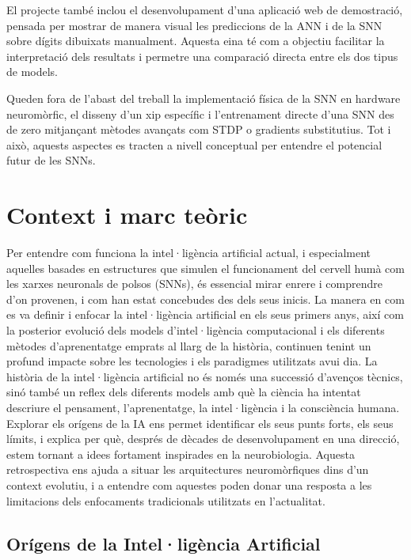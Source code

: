 \documentclass[a4paper,11pt, titlepage, twoside]{article}
\begin{document}
El projecte també inclou el desenvolupament d’una aplicació web de demostració, pensada per mostrar de manera visual les prediccions de la ANN i de la SNN sobre dígits dibuixats manualment. Aquesta eina té com a objectiu facilitar la interpretació dels resultats i permetre una comparació directa entre els dos tipus de models.

Queden fora de l’abast del treball la implementació física de la SNN en hardware neuromòrfic, el disseny d’un xip específic i l’entrenament directe d’una SNN des de zero mitjançant mètodes avançats com STDP o gradients substitutius. Tot i això, aquests aspectes es tracten a nivell conceptual per entendre el potencial futur de les SNNs.
\section{Context i marc teòric}

Per entendre com funciona la intel·ligència artificial actual, i especialment aquelles basades en estructures que simulen el funcionament del cervell humà com les xarxes neuronals de polsos (SNNs), és essencial mirar enrere i comprendre d'on provenen, i com han estat concebudes des dels seus inicis. La manera en com es va definir i enfocar la intel·ligència artificial en els seus primers anys, així com la posterior evolució dels models d'intel·ligència computacional i els diferents mètodes d'aprenentatge emprats al llarg de la història, continuen tenint un profund impacte sobre les tecnologies i els paradigmes utilitzats avui dia. La història de la intel·ligència artificial no és només una successió d'avenços tècnics, sinó també un reflex dels diferents models amb què la ciència ha intentat descriure el pensament, l'aprenentatge, la intel·ligència i la consciència humana. Explorar els orígens de la IA ens permet identificar els seus punts forts, els seus límits, i explica per què, després de dècades de desenvolupament en una direcció, estem tornant a idees fortament inspirades en la neurobiologia. Aquesta retrospectiva ens ajuda a situar les arquitectures neuromòrfiques dins d'un context evolutiu, i a entendre com aquestes poden donar una resposta a les limitacions dels enfocaments tradicionals utilitzats en l'actualitat.
\subsection{Orígens de la Intel·ligència Artificial}
\end{document}

